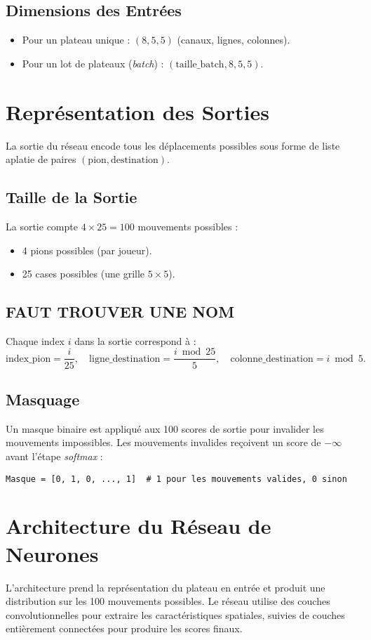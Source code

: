 \documentclass[]{article}
\begin{document}
\subsection{Dimensions des Entrées}
\begin{itemize}
    \item Pour un plateau unique : \((8, 5, 5)\) (canaux, lignes, colonnes).
    \item Pour un lot de plateaux (\textit{batch}) : \((\text{taille\_batch}, 8, 5, 5)\).
\end{itemize}

\section{Représentation des Sorties}
La sortie du réseau encode tous les déplacements possibles sous forme de liste aplatie de paires \((\text{pion}, \text{destination})\).

\subsection{Taille de la Sortie}
La sortie compte \(4 \times 25 = 100\) mouvements possibles :
\begin{itemize}
    \item 4 pions possibles (par joueur).
    \item 25 cases possibles (une grille \(5 \times 5\)).
\end{itemize}

\subsection{FAUT TROUVER UNE NOM} %
Chaque index \(i\) dans la sortie correspond à :
\[
\text{index\_pion} = \frac{i}{25}, \quad
\text{ligne\_destination} = \frac{i \bmod 25}{5}, \quad
\text{colonne\_destination} = i \bmod 5.
\]

\subsection{Masquage}
Un masque binaire est appliqué aux 100 scores de sortie pour invalider les mouvements impossibles. Les mouvements invalides reçoivent un score de \(-\infty\) avant l'étape \textit{softmax} :
\begin{verbatim}
Masque = [0, 1, 0, ..., 1]  # 1 pour les mouvements valides, 0 sinon
\end{verbatim}

\section{Architecture du Réseau de Neurones}
L'architecture prend la représentation du plateau en entrée et produit une distribution sur les 100 mouvements possibles. Le réseau utilise des couches convolutionnelles pour extraire les caractéristiques spatiales, suivies de couches entièrement connectées pour produire les scores finaux.
\end{document}
